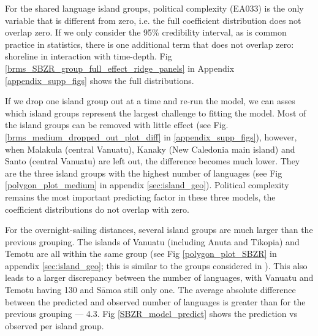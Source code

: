 \documentclass[12pt,letterpaper]{article}
\begin{document}
For the shared language island groups, political complexity (EA033) is the only variable that is different from zero, i.e. the full coefficient distribution does not overlap zero. If we only consider the 95\% credibility interval, as is common practice in statistics, there is one additional term that does not overlap zero: shoreline in interaction with time-depth. Fig \ref{brms_SBZR_group_full_effect_ridge_panels} in Appendix \ref{appendix_supp_figs} shows the full distributions.

If we drop one island group out at a time and re-run the model, we can asses which island groups represent the largest challenge to fitting the model. Most of the island groups can be removed with little effect (see Fig. \ref{brms_medium_dropped_out_plot_diff} in \ref{appendix_supp_figs}), however, when Malakula (central Vanuatu), Kanaky (New Caledonia main island) and Santo (central Vanuatu) are left out, the difference becomes much lower. They are the three island groups with the highest number of languages (see Fig \ref{polygon_plot_medium} in appendix \ref{sec:island_geo}). Political complexity remains the most important predicting factor in these three models, the coefficient distributions do not overlap with zero.


For the overnight-sailing distances, several island groups are much larger than the previous grouping. The islands of Vanuatu  (including Anuta and Tikopia) and Temotu are all within the same group (see Fig \ref{polygon_plot_SBZR} in appendix \ref{sec:island_geo}; this is similar to the groups considered in \citet{pawley2007}). This also leads to a larger discrepancy between the number of languages, with Vanuatu and Temotu having 130 and S\={a}moa still only one. The average absolute difference between the predicted and observed number of languages is greater than for the previous grouping --- 4.3. Fig \ref{SBZR_model_predict} shows the prediction vs observed per island group.
\end{document}
